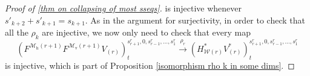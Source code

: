\documentclass[11pt]{amsart} \renewcommand{\baselinestretch}{1.2}
\theoremstyle{plain}
\theoremstyle{definition}
\renewcommand{\to}{\longrightarrow}
\newcommand{\calV}{\mathcal{V}}
\newcommand{\calw}{\mathcal{W}}
\newcommand{\calMv}{\mathcal{M}\dver}
\newcommand{\calMh}{\mathcal{M}\dhor}
\newcommand{\vect}[2]{\calV^{#1}_{#2}}
\newcommand{\UEAX}{\bar{X}'}%
\newcommand{\dver}{_\mathrm{v}}
\newcommand{\dhor}{_\mathrm{h}}
\newcommand{\Sqh}{\mathrm{Sq}\dhor}
\begin{document}
\begin{Calculations of HWn}
\begin{proof}[Proof of \ref{thm on collapsing of most sseqs}]
is injective whenever $s'_{k+2}+s'_{k+1}=s_{k+1}$. As in the argument for surjectivity, in order to check that all the $\rho_k$ are injective, we now only need to check that every map
\[(F^{\calMh(r+1)}F^{\calMv(r+1)}V_{(r)})^{s_{r+1}^{r},0,s_{r-1}^{r},\ldots,s_1^{r}}_{t} \overset{\rho_r}{\to}(H^*_{\calw(r)}V^*_{(r)})^{s_{r+1}^{r},0,s_{r-1}^{r},\ldots,s_1^{r}}_{t}\]
is injective, which is part of Proposition \ref{isomorphism rho k in some dims}.
%
\end{proof}

\end{Calculations of HWn}
\end{document}
